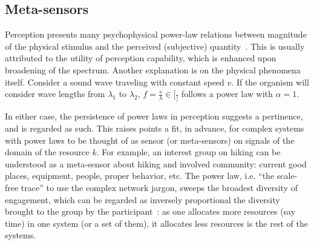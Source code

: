 \documentclass[a4paper, 11pt]{article} %
\begin{document}
\subsection{Meta-sensors}
Perception presents many psychophysical power-law 
relations between
magnitude of the physical stimulus and the perceived 
(subjective) quantity~\cite{stev,web}.
This is usually attributed to the utility of perception capability,
which is enhanced upon broadening of the spectrum.
Another explanation is on the physical phenomena itself.
Consider a sound wave traveling with constant speed $v$.
If the organism will consider wave lengths from $\lambda_1$
to $\lambda_2$, $f=\frac{v}{\lambda} \in [\frac{}]$ follows
a power law with $\alpha=1$.

In either case, the persistence of power laws in perception
suggests a pertinence, and is regarded as such. This raises
points a fit, in advance, for complex systems with power laws
to be thought of as sensor (or meta-sensors) on signals
of the domain of the resource $k$.
For example, an interest group on hiking can be understood as
a meta-sensor about hiking and involved community: current good
places, equipment, people, proper behavior, etc.
The power law, i.e. ``the scale-free trace'' to use
the complex network jargon, sweeps the broadest 
diversity of engagement, which can be regarded as
inversely proportional the diversity brought to the group
by the participant~\cite{tStable}: 
as one allocates more resources (say time)
in one system (or a set of them),
it allocates less resources is the rest of the systems.
\end{document}
